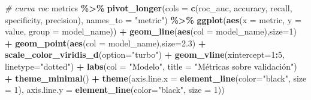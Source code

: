 \documentclass[12pt,a4paper,]{book}
\newenvironment{Shaded}{\begin{snugshade}}{\end{snugshade}}
\newcommand{\AttributeTok}[1]{\textcolor[rgb]{0.13,0.29,0.53}{#1}}
\newcommand{\CommentTok}[1]{\textcolor[rgb]{0.56,0.35,0.01}{\textit{#1}}}
\newcommand{\DecValTok}[1]{\textcolor[rgb]{0.00,0.00,0.81}{#1}}
\newcommand{\FloatTok}[1]{\textcolor[rgb]{0.00,0.00,0.81}{#1}}
\newcommand{\FunctionTok}[1]{\textcolor[rgb]{0.13,0.29,0.53}{\textbf{#1}}}
\newcommand{\NormalTok}[1]{#1}
\newcommand{\SpecialCharTok}[1]{\textcolor[rgb]{0.81,0.36,0.00}{\textbf{#1}}}
\newcommand{\StringTok}[1]{\textcolor[rgb]{0.31,0.60,0.02}{#1}}
\numberwithin{dummy}{section}
\theoremstyle{ocrenumbox}
\theoremstyle{blacknumex}
\theoremstyle{blacknumbox}
\theoremstyle{ocrenum}
\theoremstyle{ocrenum}
\begin{document}
\begin{Shaded}
\begin{Highlighting}[]
\CommentTok{\# curva roc}
\NormalTok{metrics }\SpecialCharTok{\%\textgreater{}\%} 
  \FunctionTok{pivot\_longer}\NormalTok{(}\AttributeTok{cols =} \FunctionTok{c}\NormalTok{(roc\_auc, accuracy, recall, specificity, precision),}
               \AttributeTok{names\_to =} \StringTok{"metric"}\NormalTok{) }\SpecialCharTok{\%\textgreater{}\%} 
  \FunctionTok{ggplot}\NormalTok{(}\FunctionTok{aes}\NormalTok{(}\AttributeTok{x =}\NormalTok{ metric, }\AttributeTok{y =}\NormalTok{ value, }\AttributeTok{group =}\NormalTok{ model\_name)) }\SpecialCharTok{+}
  \FunctionTok{geom\_line}\NormalTok{(}\FunctionTok{aes}\NormalTok{(}\AttributeTok{col =}\NormalTok{ model\_name),}\AttributeTok{size=}\DecValTok{1}\NormalTok{) }\SpecialCharTok{+}
  \FunctionTok{geom\_point}\NormalTok{(}\FunctionTok{aes}\NormalTok{(}\AttributeTok{col =}\NormalTok{ model\_name),}\AttributeTok{size=}\FloatTok{2.3}\NormalTok{) }\SpecialCharTok{+}
  \FunctionTok{scale\_color\_viridis\_d}\NormalTok{(}\AttributeTok{option=}\StringTok{"turbo"}\NormalTok{) }\SpecialCharTok{+}
  \FunctionTok{geom\_vline}\NormalTok{(}\AttributeTok{xintercept=}\DecValTok{1}\SpecialCharTok{:}\DecValTok{5}\NormalTok{, }\AttributeTok{linetype=}\StringTok{"dotted"}\NormalTok{) }\SpecialCharTok{+}
  \FunctionTok{labs}\NormalTok{(}\AttributeTok{col =} \StringTok{"Modelo"}\NormalTok{, }\AttributeTok{title =} \StringTok{"Métricas sobre validación"}\NormalTok{) }\SpecialCharTok{+}
  \FunctionTok{theme\_minimal}\NormalTok{() }\SpecialCharTok{+}
  \FunctionTok{theme}\NormalTok{(}\AttributeTok{axis.line.x =} \FunctionTok{element\_line}\NormalTok{(}\AttributeTok{color=}\StringTok{"black"}\NormalTok{, }\AttributeTok{size =} \DecValTok{1}\NormalTok{),}
        \AttributeTok{axis.line.y =} \FunctionTok{element\_line}\NormalTok{(}\AttributeTok{color=}\StringTok{"black"}\NormalTok{, }\AttributeTok{size =} \DecValTok{1}\NormalTok{))}
  

\end{Highlighting}
\end{Shaded}
\end{document}
